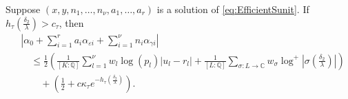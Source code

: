 \begin{lemma}\label{lem:archellest}
Suppose $(x,y, n_1, \dots, n_{\nu}, a_1, \dots, a_r)$ is a solution of \eqref{eq:EfficientSunit}. If ${h_{\tau} \left(\frac{\delta_2}{\lambda}\right) > c_{\tau}}$, then  
\begin{align*}
& \left|\alpha_0+\sum_{i = 1}^r a_i \alpha_{\varepsilon i} + \sum_{i = 1}^{\nu} n_i \alpha_{\gamma i}\right| \\
	& \quad \leq \frac{1}{2}\left(\frac{1}{[K:\mathbb{Q}]}\sum_{l = 1}^{\nu}w_l \log(p_l)|u_l - r_l| + \frac{1}{[L:\mathbb{Q}]}\sum_{\sigma :L \to \mathbb{C}} w_{\sigma}\log^+ \left|\sigma\left(\frac{\delta_2}{\lambda}\right)\right| \right)\\
	&\quad\quad + \left(\frac{1}{2} + c\kappa_{\tau}e^{-h_{\tau}\left(\frac{\delta_2}{\lambda}\right)}\right).
\end{align*} 
\end{lemma}

